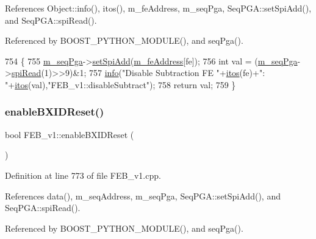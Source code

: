 References Object\+::info(), itos(), m\+\_\+fe\+Address, m\+\_\+seq\+Pga, Seq\+P\+G\+A\+::set\+Spi\+Add(), and Seq\+P\+G\+A\+::spi\+Read().



Referenced by B\+O\+O\+S\+T\+\_\+\+P\+Y\+T\+H\+O\+N\+\_\+\+M\+O\+D\+U\+L\+E(), and seq\+Pga().


\begin{DoxyCode}
754                                     \{
755   \hyperlink{classFEB__v1_a6c7804ac86796f233a8393043adf2e77}{m\_seqPga}->\hyperlink{classSeqPGA_ac998ce3a6d9b5f2e88cc8393f8c1df53}{setSpiAdd}(\hyperlink{classFEB__v1_a4e1945c2d5b434125f375e9d0fc6d99f}{m\_feAddress}[fe]);
756   \textcolor{keywordtype}{int} val = (\hyperlink{classFEB__v1_a6c7804ac86796f233a8393043adf2e77}{m\_seqPga}->\hyperlink{classSeqPGA_ab3d0e5e5d4014bc7a92588a76b8713d4}{spiRead}(1)>>9)&1;
757   \hyperlink{classObject_a644fd329ea4cb85f54fa6846484b84a8}{info}(\textcolor{stringliteral}{"Disable Subtraction FE "}+\hyperlink{Tools_8h_af330027dbdafb9a30768b3613c553e60}{itos}(fe)+\textcolor{stringliteral}{": "}+\hyperlink{Tools_8h_af330027dbdafb9a30768b3613c553e60}{itos}(val),\textcolor{stringliteral}{"FEB\_v1::disableSubtract"});
758   \textcolor{keywordflow}{return} val;
759 \}
\end{DoxyCode}
\mbox{\label{classFEB__v1_ac8186be2d5fd8122092d6475e77395e9}} 
\subsubsection{\texorpdfstring{enable\+B\+X\+I\+D\+Reset()}{enableBXIDReset()}}
{\footnotesize\ttfamily bool F\+E\+B\+\_\+v1\+::enable\+B\+X\+I\+D\+Reset (\begin{DoxyParamCaption}{ }\end{DoxyParamCaption})}



Definition at line 773 of file F\+E\+B\+\_\+v1.\+cpp.



References data(), m\+\_\+seq\+Address, m\+\_\+seq\+Pga, Seq\+P\+G\+A\+::set\+Spi\+Add(), and Seq\+P\+G\+A\+::spi\+Read().



Referenced by B\+O\+O\+S\+T\+\_\+\+P\+Y\+T\+H\+O\+N\+\_\+\+M\+O\+D\+U\+L\+E(), and seq\+Pga().


